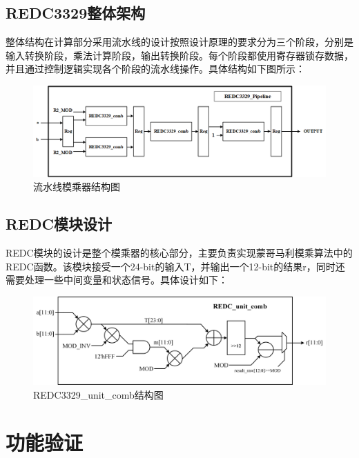 \documentclass[UTF8]{ctexart}
\begin{document}
\subsection{REDC3329整体架构}
整体结构在计算部分采用流水线的设计按照设计原理的要求分为三个阶段，分别是输入转换阶段，乘法计算阶段，输出转换阶段。每个阶段都使用寄存器锁存数据，并且通过控制逻辑实现各个阶段的流水线操作。具体结构如下图所示：
\begin{figure}[H]
	\centering
	\includegraphics[scale=0.65]{1.png}
	\caption{流水线模乘器结构图}	
\end{figure}
\subsection{REDC模块设计}
REDC模块的设计是整个模乘器的核心部分，主要负责实现蒙哥马利模乘算法中的REDC函数。该模块接受一个24-bit的输入T，并输出一个12-bit的结果r，同时还需要处理一些中间变量和状态信号。具体设计如下：
\begin{figure}[H]
	\centering
	\includegraphics[scale=1.2]{2.png}
	\caption{REDC3329\_unit\_comb结构图}	
\end{figure}
\section{功能验证}
\end{document}
